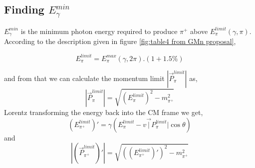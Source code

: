 \documentclass[11pt,letterpaper]{article}
\begin{document}
\begin{table}[h!]
    \centering
    \caption{Results I obtained for the same input parameters as in the proposal}
    \label{Threshold calculation results table}
\end{table}

\subsection{Finding  $E^{min}_\gamma$}\label{sec:E_gamma_min}
 $E^{min}_\gamma$ is the minimum photon energy required to produce $\pi^+$ above $E^{limit}_{\pi}(\gamma,\pi)$. According to the description given in figure \ref{fig:table4 from GMn proposal},

 \begin{equation}
    E^{limit}_{\pi} = E^{max}_{\pi}(\gamma,2\pi).(1 + 1.5\%)
 \end{equation}

and from that we can calculate the momentum limit $|\vec{P}^{limit}_{\pi}|$ as,
\begin{equation}
    |\vec{P}^{limit}_{\pi}| = \sqrt{ (E^{limit}_{\pi})^2 - m_{\pi^+}^2 }
\end{equation}
Lorentz transforming the energy back into the CM frame we get,
\begin{equation}
    (E^{limit}_{\pi^+})' = \gamma(E^{limit}_{\pi} - v\vec|{P}^{limit}_{\pi}|\cos{\theta})
\end{equation}
and 
\begin{equation}
    |(\vec{P}^{limit}_{\pi^+})'| = \sqrt{ ((E^{limit}_{\pi^+})')^2  - m_{\pi^+}^2 }
\end{equation}
\end{document}
